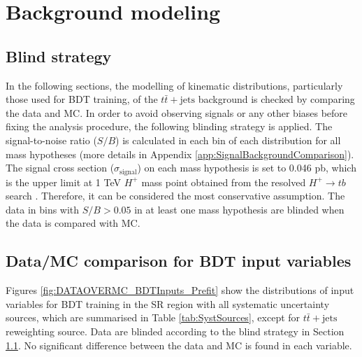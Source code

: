 \section{Background modeling}
\label{sec:BkgModeling}

\subsection{Blind strategy}
\label{subsec:BlindStrategy}
In the following sections, the modelling of kinematic distributions, particularly those used for BDT training, of the $t\bar{t}+\text{jets}$ background is checked by comparing the data and MC. In order to avoid observing signals or any other biases before fixing the analysis procedure, the following blinding strategy is applied. The signal-to-noise ratio ($S/B$) is calculated in each bin of each distribution for all mass hypotheses (more details in Appendix \ref{app:SignalBackgroundComparison}). The signal cross section (${\sigma}_{\text{signal}}$) on each mass hypothesis is set to 0.046 pb, which is the upper limit at 1 TeV $H^{+}$ mass point obtained from the resolved $H^{+}{\rightarrow}tb$ search \cite{HDBS-2021-02}. Therefore, it can be considered the most conservative assumption. The data in bins with $S/B>0.05$ in at least one mass hypothesis are blinded when the data is compared with MC.

\subsection{Data/MC comparison for BDT input variables}
\label{subsec:Data/MCBDTInputBeforeReweight}
Figures \ref{fig:DATAOVERMC_BDTInputs_Prefit} show the distributions of input variables for BDT training in the SR region with all systematic uncertainty sources, which are summarised in Table \ref{tab:SystSources}, except for $t\bar{t}+\text{jets}$ reweighting source. Data are blinded according to the blind strategy in Section \ref{subsec:BlindStrategy}. No significant difference between the data and MC is found in each variable.

